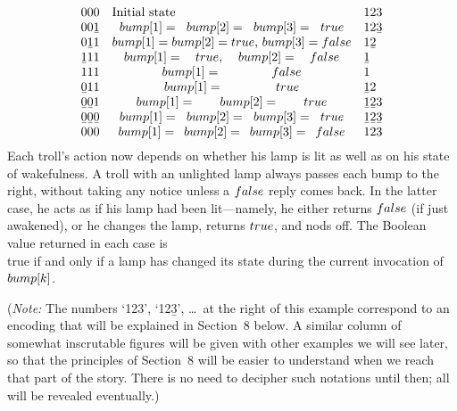 $$\vbox{\halign{#\quad&#\hfil\quad&#\hfil\cr
      000&Initial state & 123\cr
    00\b1&$\\{bump}[1]=\\{bump}[2]=\\{bump}[3]=\\{true}$&12\b3\cr
    0\b11&$\\{bump}[1]=\\{bump}[2]=\\{true}$, $\\{bump}[3]=\\{false}$&1\b2\cr
    \b111&$\\{bump}[1]=\\{true}$, $\\{bump}[2]=\\{false}$&\b1\cr
      111&$\\{bump}[1]=\\{false}$&1\cr
    \b011&$\\{bump}[1]=\\{true}$&\b12\cr
  \b0\b01&$\\{bump}[1]=\\{bump}[2]=\\{true}$&\b1\b23\cr
\b0\b0\b0&$\\{bump}[1]=\\{bump}[2]=\\{bump}[3]=\\{true}$&\b1\b2\b3\cr
      000&$\\{bump}[1]=\\{bump}[2]=\\{bump}[3]=\\{false}$&123\cr}}$$
Each troll's action now depends on whether his lamp is lit
as well as on his state of wakefulness. A troll with an
unlighted lamp always passes each bump to the right, without
taking any notice unless a $\\{false}$ reply comes back. In
the latter case, he acts as if his lamp had been
lit\dash---namely, he either returns $\\{false}$ (if just
awakened), or he changes the lamp, returns 
$\\{true}$, and nods off.
The Boolean value returned in each case is \\{true} if and only if a lamp has
changed its state during the current invocation of $\\{bump}[k]$.

({\it Note:\/} The numbers `123', `12\b3', \dots\ at the right
of this example correspond to an encoding that will be
explained in Section~8 below. A similar column of somewhat
inscrutable figures will be given with other examples we
will see later, so that the principles of Section~8 will be
easier to understand when we reach that part of the story.
There is no need to decipher such notations until then; all
will be revealed eventually.)

